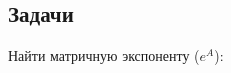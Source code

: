 \subsection{Задачи}

	Найти матричную экспоненту ($e^{A}$):
	\begin{multicols}{3}
		\begin{enumtasks}


\end{enumtasks}
\end{multicols}
